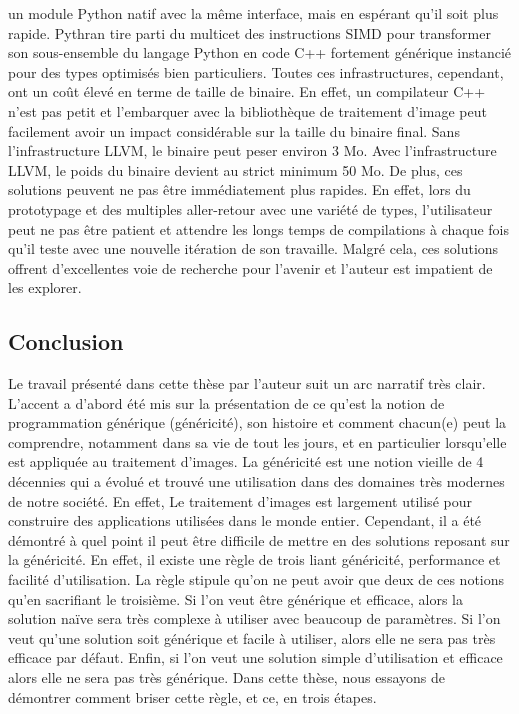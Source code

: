 un module Python natif avec la même interface, mais en espérant qu'il soit plus rapide. Pythran tire parti du
multic\oeur et des instructions SIMD pour transformer son sous-ensemble du langage Python en code C++ fortement
générique instancié pour des types optimisés bien particuliers. Toutes ces infrastructures, cependant, ont un coût élevé
en terme de taille de binaire. En effet, un compilateur C++ n'est pas petit et l'embarquer avec la bibliothèque de
traitement d'image peut facilement avoir un impact considérable sur la taille du binaire final. Sans l'infrastructure
LLVM, le binaire peut peser environ 3 Mo. Avec l'infrastructure LLVM, le poids du binaire devient au strict minimum 50
Mo. De plus, ces solutions peuvent ne pas être immédiatement plus rapides. En effet, lors du prototypage et des
multiples aller-retour avec une variété de types, l'utilisateur peut ne pas être patient et attendre les longs temps de
compilations à chaque fois qu'il teste avec une nouvelle itération de son travaille. Malgré cela, ces solutions
offrent d'excellentes voie de recherche pour l'avenir et l'auteur est impatient de les explorer.


\subsection*{Conclusion}


Le travail présenté dans cette thèse par l'auteur suit un arc narratif très clair. L'accent a d'abord été mis sur la
présentation de ce qu'est la notion de programmation générique (généricité), son histoire et comment chacun(e) peut la
comprendre, notamment dans sa vie de tout les jours, et en particulier lorsqu'elle est appliquée au traitement d'images.
La généricité est une notion vieille de 4 décennies qui a évolué et trouvé une utilisation dans des domaines très
modernes de notre société. En effet, Le traitement d'images est largement utilisé pour construire des applications
utilisées dans le monde entier. Cependant, il a été démontré à quel point il peut être difficile de mettre en \oeuvre
des solutions reposant sur la généricité. En effet, il existe une règle de trois liant généricité, performance et
facilité d'utilisation. La règle stipule qu'on ne peut avoir que deux de ces notions qu'en sacrifiant le troisième. Si
l'on veut être générique et efficace, alors la solution naïve sera très complexe à utiliser avec beaucoup de paramètres.
Si l'on veut qu'une solution soit générique et facile à utiliser, alors elle ne sera pas très efficace par défaut.
Enfin, si l'on veut une solution simple d'utilisation et efficace alors elle ne sera pas très générique. Dans cette
thèse, nous essayons de démontrer comment briser cette règle, et ce, en trois étapes.

